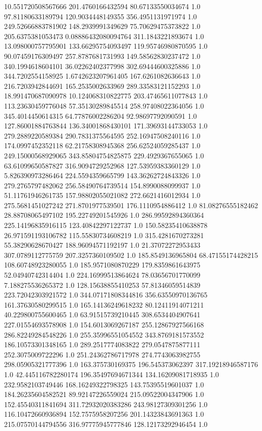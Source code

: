 10.551720508567666	201.4760166432594	80.67133550034674	1.0
97.81180633189794	120.9034448149355	356.4951131971974	1.0
249.52666883781902	148.2939991349629	75.70629475373822	1.0
205.6375381053473	0.08886432080094764	311.1843221893674	1.0
13.098000757795901	133.66295754093497	119.95746980870595	1.0
90.07459176309497	257.8787681731993	149.58562830237472	1.0
340.1994618604101	36.02262402377998	302.69444600325886	1.0
344.7202554158925	1.6742623207961405	167.6261082636643	1.0
216.7203942844691	165.2535002633969	289.33583121152293	1.0
18.991470687090978	10.124068310822775	203.47465611077843	1.0
113.23630459776048	57.35130289845514	258.97408022364056	1.0
345.4014450614315	64.77876002286204	92.98697792090591	1.0
127.86001884763844	136.34001868430101	171.39693144733053	1.0
279.2889220589384	290.7831375564595	252.16947508240116	1.0
174.0997452352118	62.21758308945368	256.62524059285437	1.0
249.15000568929065	343.85804754825875	229.4929367655065	1.0
63.61099650587827	316.9094729252968	127.53959383360129	1.0
5.826390973286464	224.5594359665799	143.36262724843326	1.0
279.2765797482062	256.58490764739514	154.8990088099937	1.0
51.11761946261735	157.98802055021082	272.6621416012934	1.0
275.5681451027242	271.8701977539501	176.1110954886412	1.0
81.08276555182462	28.88708065497102	195.22749201545926	1.0
286.99592894360364	225.14196835916115	123.40842297122737	1.0
150.58235410638878	26.971591193106782	115.55830734608219	1.0
315.4281670273281	55.38290628670427	188.96094571192197	1.0
21.37072272953433	307.0789112775759	207.3257360109502	1.0
185.8549136965804	68.47155174428215	108.60748923280055	1.0
185.9571080870229	179.8359861643975	52.04940742314404	1.0
224.16999513864624	78.03656701770099	7.188275536265372	1.0
128.15638855410253	57.81346059514839	223.72042303921572	1.0
344.07171808344816	356.63550970136765	161.37630580299515	1.0
165.14136249618232	80.12411914071211	40.229800755600465	1.0
63.91515739210445	308.6534404907641	227.01554693578908	1.0
154.6013069267187	255.12867927566168	286.82249284548226	1.0
255.35996551054552	343.8769181573552	186.10573301348165	1.0
289.2517774083822	279.0547875877111	252.3075009722296	1.0
251.24362786717978	274.7743063982755	298.05905321777396	1.0
163.375730169375	196.545373062397	317.19218946587176	1.0
42.445116782280174	196.35497694671344	134.16209081718935	1.0
232.9582103749446	168.16249322798325	143.75395519601037	1.0
184.26235604582521	89.92147226559024	215.09522004347906	1.0
152.45540311841694	311.72932020383286	243.98127309301256	1.0
116.10472660936894	152.7575958207256	201.14323843691363	1.0
215.07570144794556	316.97775945777846	128.12173292946454	1.0
